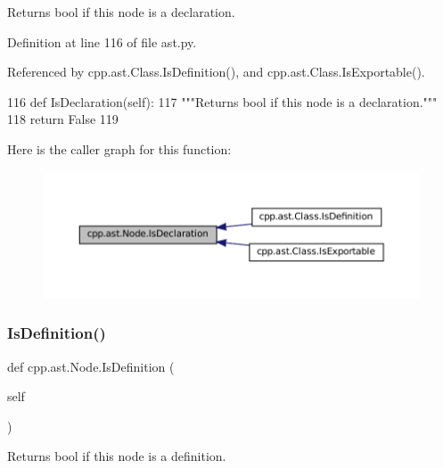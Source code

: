 \begin{DoxyVerb}Returns bool if this node is a declaration.\end{DoxyVerb}
 

Definition at line 116 of file ast.\+py.



Referenced by cpp.\+ast.\+Class.\+Is\+Definition(), and cpp.\+ast.\+Class.\+Is\+Exportable().


\begin{DoxyCode}
116     \textcolor{keyword}{def }IsDeclaration(self):
117         \textcolor{stringliteral}{"""Returns bool if this node is a declaration."""}
118         \textcolor{keywordflow}{return} \textcolor{keyword}{False}
119 
\end{DoxyCode}
Here is the caller graph for this function\+:
\nopagebreak
\begin{figure}[H]
\begin{center}
\leavevmode
\includegraphics[width=350pt]{classcpp_1_1ast_1_1Node_ab3eca703a79fb65bc25dfbcb7547c79e_icgraph}
\end{center}
\end{figure}
\mbox{\label{classcpp_1_1ast_1_1Node_a684ee9a357168e7e07a24fc6812f66e6}} 
\subsubsection{\texorpdfstring{Is\+Definition()}{IsDefinition()}}
{\footnotesize\ttfamily def cpp.\+ast.\+Node.\+Is\+Definition (\begin{DoxyParamCaption}\item[{}]{self }\end{DoxyParamCaption})}

\begin{DoxyVerb}Returns bool if this node is a definition.\end{DoxyVerb}
 

